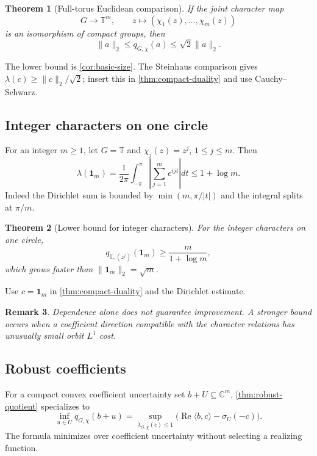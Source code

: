 \documentclass[12pt,a4paper,twoside]{extarticle}
\makeatletter
\theoremstyle{compactplain}
\newtheorem{theorem}{Theorem}[section]
\theoremstyle{compactdef}
\newtheorem{remark}[theorem]{Remark}
\renewenvironment{proof}[1][\proofname]{\par\pushQED{\qed}\normalfont
  \topsep2pt\trivlist\item[\hskip\labelsep\bfseries #1\@addpunct{.}]\ignorespaces}
 {\popQED\endtrivlist\@endpefalse}
\makeatother
\begin{document}
\begin{theorem}[Full-torus Euclidean comparison]\label{thm:full-torus-scale}
If the joint character map
\[
  G\longrightarrow\mathbb T^m,\qquad
  z\longmapsto(\chi_1(z),\dots,\chi_m(z))
\]
is an isomorphism of compact groups, then
\[
 \|a\|_2\le q_{G,\chi}(a)\le\sqrt2\|a\|_2.
\]
\end{theorem}
\begin{proof}
The lower bound is \cref{cor:basic-size}.  The Steinhaus comparison gives $\lambda(c)\ge\|c\|_2/\sqrt2$; insert this in \cref{thm:compact-duality} and use Cauchy--Schwarz.
\end{proof}

\subsection{Integer characters on one circle}
For an integer $m\ge1$, let $G=\mathbb T$ and $\chi_j(z)=z^j$, $1\le j\le m$.  Then
\[
 \lambda(\mathbf1_m)=\frac1{2\pi}\int_{-\pi}^{\pi}
 \left|\sum_{j=1}^me^{ijt}\right|dt\le1+\log m.
\]
Indeed the Dirichlet sum is bounded by $\min(m,\pi/|t|)$ and the integral splits at $\pi/m$.
\begin{theorem}[Lower bound for integer characters]\label{thm:coupled-lower-bound}
For the integer characters on one circle,
\[
 q_{\mathbb T,(z^j)}(\mathbf1_m)\ge\frac{m}{1+\log m},
\]
which grows faster than $\|\mathbf1_m\|_2=\sqrt m$.
\end{theorem}
\begin{proof}
Use $c=\mathbf1_m$ in \cref{thm:compact-duality} and the Dirichlet estimate.
\end{proof}

\begin{remark}
Dependence alone does not guarantee improvement.  A stronger bound occurs when a coefficient direction compatible with the character relations has unusually small orbit $L^1$ cost.
\end{remark}

\subsection{Robust coefficients}
For a compact convex coefficient uncertainty set $b+U\subseteq\mathbb C^m$, \cref{thm:robust-quotient} specializes to
\[
 \inf_{u\in U}q_{G,\chi}(b+u)
 =\sup_{\lambda_{G,\chi}(c)\le1}
 \bigl(\operatorname{Re}\langle b,c\rangle-\sigma_U(-c)\bigr).
\]
The formula minimizes over coefficient uncertainty without selecting a realizing function.
\end{document}
